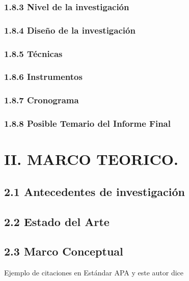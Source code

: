 \documentclass[stu, 12pt, letterpaper, donotrepeattitle, floatsintext, natbib]{apa7}
\begin{document}
\subsubsection{1.8.3 Nivel de la investigación}
\subsubsection{1.8.4 Diseño de la investigación}
\subsubsection{1.8.5 Técnicas}
\subsubsection{1.8.6 Instrumentos}
\subsubsection{1.8.7 Cronograma}
\subsubsection{1.8.8 Posible Temario del Informe Final}


\section{II. MARCO TEORICO.} \label{cap:CAPII}

\subsection{2.1 Antecedentes de investigación}


\subsection{2.2 Estado del Arte } 


\subsection{2.3 Marco Conceptual} 

Ejemplo de citaciones en Estándar APA \cite{Thiran2011} y este autor dice \cite{alothali2018detecting} \cite{9796186}

\renewcommand\refname{\large\textbf{Referencias}}



\end{document}
